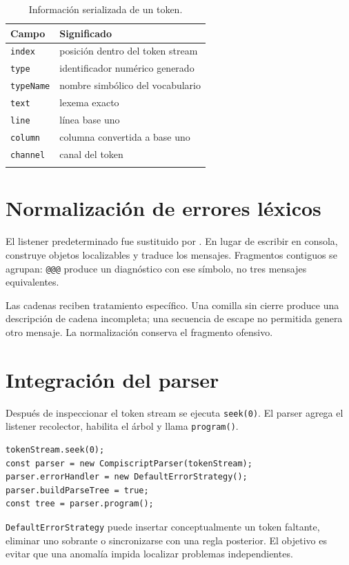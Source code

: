\documentclass[11pt,letterpaper,oneside]{report}
\newcommand{\archivo}[1]{\path{#1}}
\newcommand{\codigo}[1]{\texttt{#1}}
\begin{document}
\begin{longtable}{p{}p{}}
\toprule
Campo & Significado \\
\midrule
\endhead
\codigo{index} & posición dentro del token stream \\
\codigo{type} & identificador numérico generado \\
\codigo{typeName} & nombre simbólico del vocabulario \\
\codigo{text} & lexema exacto \\
\codigo{line} & línea base uno \\
\codigo{column} & columna convertida a base uno \\
\codigo{channel} & canal del token \\
\bottomrule
\caption{Información serializada de un token.}
\end{longtable}

\section{Normalización de errores léxicos}

El listener predeterminado fue sustituido por \archivo{CollectingErrorListener}. En
lugar de escribir en consola, construye objetos localizables y traduce los mensajes.
Fragmentos contiguos se agrupan: \codigo{@@@} produce un diagnóstico con ese símbolo,
no tres mensajes equivalentes.

Las cadenas reciben tratamiento específico. Una comilla sin cierre produce una
descripción de cadena incompleta; una secuencia de escape no permitida genera otro
mensaje. La normalización conserva el fragmento ofensivo.

\section{Integración del parser}

Después de inspeccionar el token stream se ejecuta \codigo{seek(0)}. El parser agrega
el listener recolector, habilita el árbol y llama \codigo{program()}.

\begin{verbatim}
tokenStream.seek(0);
const parser = new CompiscriptParser(tokenStream);
parser.errorHandler = new DefaultErrorStrategy();
parser.buildParseTree = true;
const tree = parser.program();
\end{verbatim}

\codigo{DefaultErrorStrategy} puede insertar conceptualmente un token faltante,
eliminar uno sobrante o sincronizarse con una regla posterior. El objetivo es evitar
que una anomalía impida localizar problemas independientes.
\end{document}
